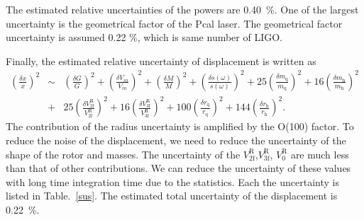 \documentclass[A4]{spie}  %
\begin{document}
The estimated relative uncertainties of the powers are 0.40~\%. One of the largest uncertainty is the geometrical factor of the Pcal laser. The geometrical factor uncertainty is assumed 0.22 \%, which is same number of LIGO. 

 Finally, the estimated relative uncertainty of  displacement is written as
\begin{eqnarray}
\left( \frac{\delta x}{x} \right)^2 &\sim& \left( \frac{\delta G}{G} \right)^2 +\left( \frac{\delta V_{in}}{V_{in}} \right)^2+\left( \frac{\delta M}{M} \right)^2+\left( \frac{\delta s(\omega)}{s(\omega)} \right)^2+ 25\left( \frac{\delta m_{\mathrm{q}}}{m_{\mathrm{q}}} \right)^2 +16\left( \frac{\delta m_{\mathrm{h}}}{m_{\mathrm{h}}} \right)^2 \nonumber \\
&+&25\left( \frac{\delta V^{\mathrm{R}}_{{\mathrm{2f}}}}{V^{\mathrm{R}}_{{\mathrm{2f}}}} \right)^2+16\left( \frac{\delta V^{\mathrm{R}}_{{\mathrm{3f}}}}{V^{\mathrm{R}}_{{\mathrm{3f}}}} \right)^2+ 100\left( \frac{\delta r_{\mathrm{q}}}{r_{\mathrm{q}}} \right)^2 +144\left( \frac{\delta r_{\mathrm{h}}}{r_{\mathrm{h}}} \right)^2. \label{deltax}
\end{eqnarray}
The contribution of the radius uncertainty is amplified by the O(100) factor. To reduce the noise of the displacement, we need to reduce the uncertainty of the shape of the rotor and masses.
The uncertainty of the $V^{\mathrm{R}}_{\mathrm{2f}}$,$V^{\mathrm{R}}_{\mathrm{3f}}$, $V^{\mathrm{R}}_{0}$ are much less than that of other contributions. We can reduce the uncertainty of these values with long time integration time due to the statistics. Each the uncertainty is listed in Table.~\ref{sus}. The estimated  total uncertainty of the displacement is 0.22~\%.

\end{document}
